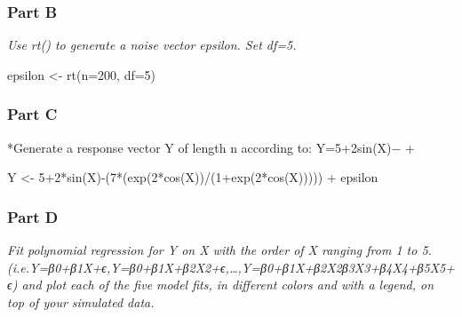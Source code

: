\documentclass[
]{article}
\newenvironment{Shaded}{\begin{snugshade}}{\end{snugshade}}
\newcommand{\AttributeTok}[1]{\textcolor[rgb]{0.77,0.63,0.00}{#1}}
\newcommand{\DecValTok}[1]{\textcolor[rgb]{0.00,0.00,0.81}{#1}}
\newcommand{\FunctionTok}[1]{\textcolor[rgb]{0.00,0.00,0.00}{#1}}
\newcommand{\NormalTok}[1]{#1}
\newcommand{\OtherTok}[1]{\textcolor[rgb]{0.56,0.35,0.01}{#1}}
\newcommand{\SpecialCharTok}[1]{\textcolor[rgb]{0.00,0.00,0.00}{#1}}
\begin{document}
\hypertarget{part-b-2}{%
\subsubsection{Part B}\label{part-b-2}}

\emph{Use rt() to generate a noise vector epsilon. Set df=5.}

\begin{Shaded}
\begin{Highlighting}[]
\NormalTok{epsilon }\OtherTok{\textless{}{-}} \FunctionTok{rt}\NormalTok{(}\AttributeTok{n=}\DecValTok{200}\NormalTok{, }\AttributeTok{df=}\DecValTok{5}\NormalTok{)}
\end{Highlighting}
\end{Shaded}

\hypertarget{part-c-2}{%
\subsubsection{Part C}\label{part-c-2}}

*Generate a response vector Y of length n according to: Y=5+2sin(X)−
 +\epsilon*

\begin{Shaded}
\begin{Highlighting}[]
\NormalTok{Y }\OtherTok{\textless{}{-}} \DecValTok{5}\SpecialCharTok{+}\DecValTok{2}\SpecialCharTok{*}\FunctionTok{sin}\NormalTok{(X)}\SpecialCharTok{{-}}\NormalTok{(}\DecValTok{7}\SpecialCharTok{*}\NormalTok{(}\FunctionTok{exp}\NormalTok{(}\DecValTok{2}\SpecialCharTok{*}\FunctionTok{cos}\NormalTok{(X))}\SpecialCharTok{/}\NormalTok{(}\DecValTok{1}\SpecialCharTok{+}\FunctionTok{exp}\NormalTok{(}\DecValTok{2}\SpecialCharTok{*}\FunctionTok{cos}\NormalTok{(X))))) }\SpecialCharTok{+}\NormalTok{ epsilon}
\end{Highlighting}
\end{Shaded}

\hypertarget{part-d-1}{%
\subsubsection{Part D}\label{part-d-1}}

\emph{Fit polynomial regression for Y on X with the order of X ranging
from 1 to 5.
(i.e.Y=β0+β1X+ϵ,Y=β0+β1X+β2X2+ϵ,\ldots,Y=β0+β1X+β2X2β3X3+β4X4+β5X5+ϵ)
and plot each of the five model fits, in different colors and with a
legend, on top of your simulated data.}
\end{document}
